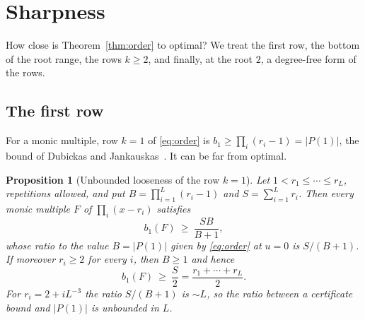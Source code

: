 \documentclass[11pt]{article}
\newtheorem{proposition}[theorem]{Proposition}
\begin{document}
\section{Sharpness}\label{sec:sharp}

How close is Theorem~\ref{thm:order} to optimal?  We treat the first row,
the bottom of the root range, the rows $k\ge2$, and finally, at the root
$2$, a degree-free form of the rows.

\subsection{The first row}

For a monic multiple, row $k=1$ of \eqref{eq:order} is
$b_1\ge\prod_i(r_i-1)=|P(1)|$, the bound of Dubickas and
Jankauskas~\cite{dj}.  It can be far from optimal.

\begin{proposition}[Unbounded looseness of the row $k=1$]
\label{prop:unbounded}
Let $1<r_1\le\cdots\le r_L$, repetitions allowed, and put
$B=\prod_{i=1}^L(r_i-1)$ and $S=\sum_{i=1}^Lr_i$.  Then every monic multiple
$F$ of $\prod_i(x-r_i)$ satisfies
\[
  b_1(F)\ \ge\ \frac{SB}{B+1},
\]
whose ratio to the value $B=|P(1)|$ given by \eqref{eq:order} at $u=0$ is
$S/(B+1)$.  If moreover $r_i\ge2$ for every $i$, then $B\ge1$ and hence
\begin{equation}\label{eq:halfsum}
  b_1(F)\ \ge\ \frac S2=\frac{r_1+\cdots+r_L}2 .
\end{equation}
For $r_i=2+iL^{-3}$ the ratio $S/(B+1)$ is $\sim L$, so the ratio
between a certificate bound and $|P(1)|$ is unbounded in $L$.
\end{proposition}
\end{document}
